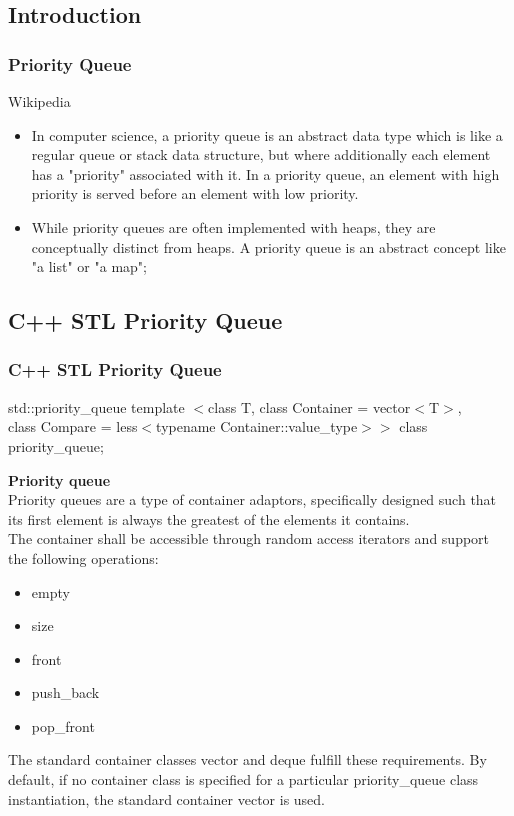 \documentclass{beamer}
\begin{document}
\subsection{Introduction}
\begin{frame}
\frametitle{Priority Queue}
\begin{block}{Wikipedia}
\begin{itemize}
\item In computer science, a priority queue is an abstract data type which is like a regular queue or stack data structure, but where additionally each element has a "priority" associated with it. In a priority queue, an element with high  priority is served before an element with low priority. 
\\
\item While priority queues are often implemented with heaps, they are conceptually distinct from heaps. A priority queue is an abstract concept like "a list" or "a map";
\end{itemize}
\end{block}
\end{frame}
\subsection{C++ STL Priority Queue} 

\begin{frame}
\frametitle{C++ STL Priority Queue}

\begin{block}{std::priority\_queue}
\small template $<$class T, class Container = vector$<$T$>$,\\
  class Compare = less$<$typename Container::value\_type$>>$ class priority\_queue;
\end{block}

\textbf{Priority queue}\\
Priority queues are a type of container adaptors, specifically designed such that its first element is always the greatest of the elements it contains.
\newline
\\
The container shall be accessible through random access iterators and support the following operations:

\begin{multicols}{3}
\begin{itemize}
	\item empty
	\item size
	\item front
	\item push\_back
	\item pop\_front
\end{itemize}
\end{multicols}

The standard container classes vector and deque fulfill these requirements. By default, if no container class is specified for a particular priority\_queue class instantiation, the standard container vector is used.

\end{frame}
\end{document}
